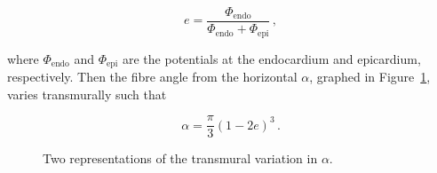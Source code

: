     \begin{equation}
      e = \frac{\Phi_\text{endo}}{\Phi_\text{endo}+\Phi_\text{epi}}\,,
    \end{equation}

    where $\Phi_\text{endo}$ and $\Phi_\text{epi}$ are the potentials at the endocardium and epicardium, respectively. Then the fibre angle from the horizontal $\alpha$, graphed in Figure~\ref{fig:transmural_variation},  varies transmurally such that

    \begin{equation}
      \alpha = \frac{\pi}{3} \left( 1 - 2e \right)^3\,.
    \end{equation}
    
    \begin{figure}[htbp]
      \centering
       \qquad
      \caption{Two representations of the transmural variation in $\alpha$.}
      \label{fig:transmural_variation}
    \end{figure}

